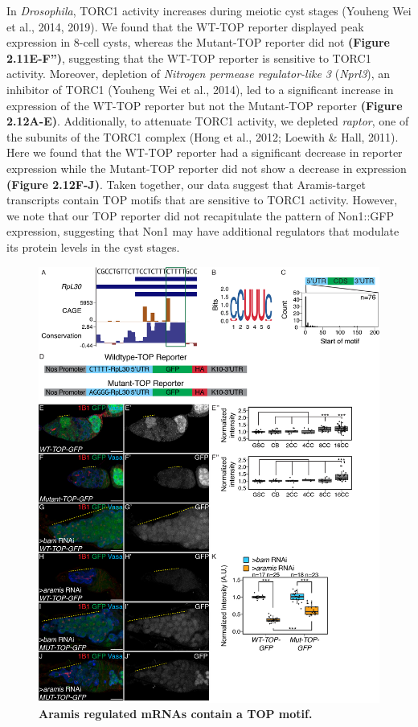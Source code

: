 \documentclass[12pt,oneside]{reedthesis}
\begin{document}
In \emph{Drosophila}, TORC1 activity increases during meiotic cyst stages (Youheng Wei et al., 2014, 2019). We found that the WT-TOP reporter displayed peak expression in 8-cell cysts, whereas the Mutant-TOP reporter did not \textbf{(Figure 2.11E-F'')}, suggesting that the WT-TOP reporter is sensitive to TORC1 activity. Moreover, depletion of \emph{Nitrogen permease regulator-like 3} (\emph{Nprl3}), an inhibitor of TORC1 (Youheng Wei et al., 2014), led to a significant increase in expression of the WT-TOP reporter but not the Mutant-TOP reporter \textbf{(Figure 2.12A-E)}. Additionally, to attenuate TORC1 activity, we depleted \emph{raptor}, one of the subunits of the TORC1 complex (Hong et al., 2012; Loewith \& Hall, 2011). Here we found that the WT-TOP reporter had a significant decrease in reporter expression while the Mutant-TOP reporter did not show a decrease in expression \textbf{(Figure 2.12F-J)}. Taken together, our data suggest that Aramis-target transcripts contain TOP motifs that are sensitive to TORC1 activity. However, we note that our TOP reporter did not recapitulate the pattern of Non1::GFP expression, suggesting that Non1 may have additional regulators that modulate its protein levels in the cyst stages.
\begin{figure}

{\centering \includegraphics[width=1\linewidth]{./figure/Ribosome Biogenesis/Ribosome Biogenesis 6} 

}

\caption[\textbf{Aramis regulated mRNAs contain a TOP motif.}]{\textbf{Aramis regulated mRNAs contain a TOP motif.}}\label{fig:unnamed-chunk-18}
\end{figure}
\end{document}
